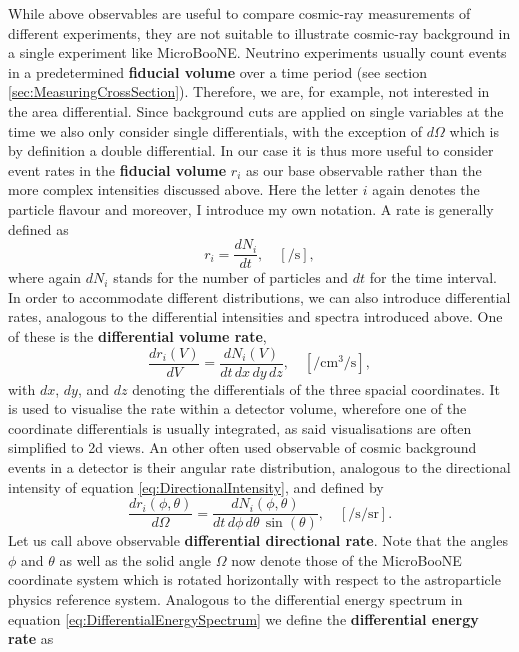 While above observables are useful to compare cosmic-ray measurements of different experiments, they are not suitable to illustrate cosmic-ray background in a single experiment like MicroBooNE. Neutrino experiments usually count events in a predetermined \textbf{fiducial volume} over a time period (see section \ref{sec:MeasuringCrossSection}). Therefore, we are, for example, not interested in the area differential. Since background cuts are applied on single variables at the time we also only consider single differentials, with the exception of $d\Omega$ which is by definition a double differential. In our case it is thus more useful to consider event rates in the \textbf{fiducial volume} $r_i$ as our base observable rather than the more complex intensities discussed above. Here the letter $i$ again denotes the particle flavour and moreover, I introduce my own notation. A rate is generally defined as
\begin{equation} \label{eq:Rate}
    r_i = \frac{dN_i}{dt}, \quad \left[ \si{\per\second} \right],
\end{equation}
where again $dN_i$ stands for the number of particles and $dt$ for the time interval. In order to accommodate different distributions, we can also introduce differential rates, analogous to the differential intensities and spectra introduced above. One of these is the \textbf{differential volume rate},
\begin{equation} \label{eq:DifferentialVolumeRate}
    \frac{dr_i(V)}{dV} = \frac{dN_i(V)}{dt \, dx \, dy \, dz}, \quad \left[ \si{\per\centi\metre\cubed\per\second} \right],
\end{equation}
with $dx$, $dy$, and $dz$ denoting the differentials of the three spacial coordinates. It is used to visualise the rate within a detector volume, wherefore one of the coordinate differentials is usually integrated, as said visualisations are often simplified to \gls{2d} views. An other often used observable of cosmic background events in a detector is their angular rate distribution, analogous to the directional intensity of equation \ref{eq:DirectionalIntensity}, and defined by
\begin{equation} \label{eq:DifferentialDirectionalRate}
    \frac{dr_i(\phi,\theta)}{d\Omega} = \frac{dN_i(\phi,\theta)}{dt \, d\phi \, d \theta \, \sin{\left(\theta\right)}}, \quad \left[ \si{\per\second\per\steradian} \right].
\end{equation}
Let us call above observable \textbf{differential directional rate}. Note that the angles $\phi$ and $\theta$ as well as the solid angle $\Omega$ now denote those of the MicroBooNE coordinate system which is rotated horizontally with respect to the astroparticle physics reference system. Analogous to the differential energy spectrum in equation \ref{eq:DifferentialEnergySpectrum} we define the \textbf{differential energy rate} as
